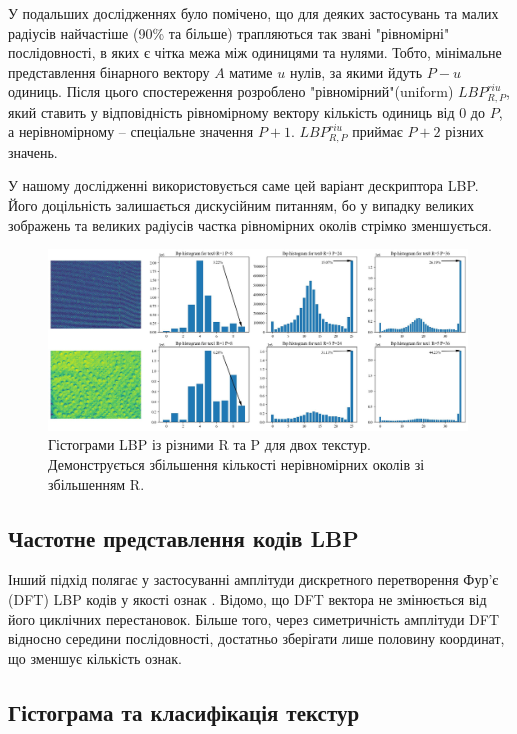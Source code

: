У подальших дослідженнях було помічено, що для деяких застосувань та малих радіусів найчастіше (90\% та більше) трапляються так звані "рівномірні"{} послідовності, 
в яких є чітка межа між одиницями та нулями. Тобто, мінімальне представлення бінарного вектору $A$ матиме $u$ нулів, за якими йдуть $P-u$ одиниць.
Після цього спостереження розроблено "рівномірний"{}(uniform) $LBP^{riu}_{R,P}$, 
який ставить у відповідність рівномірному вектору кількість одиниць від $0$ до $P$, а нерівномірному -- спеціальне значення $P+1$.
$LBP^{riu}_{R,P}$ приймає $P+2$ різних значень.

У нашому дослідженні \cite{fastlbp2024} використовується саме цей варіант дескриптора LBP.
Його доцільність залишається дискусійним питанням, бо у випадку великих зображень та великих радіусів 
частка рівномірних околів стрімко зменшується.

\begin{figure}[h]
    \centering
    \includegraphics[width=0.99\textwidth]{img/cloth-hist-lbpu.jpg}
    \caption{
        Гістограми LBP із різними R та P для двох текстур.
        Демонструється збільшення кількості нерівномірних околів зі збільшенням R.
    }
    \label{fig:cloth-hist-lbpu}
\end{figure}

\subsection{Частотне представлення кодів LBP}\label{section1.1.d}\hfill

Інший підхід полягає у застосуванні амплітуди дискретного перетворення Фур'є (DFT) LBP кодів у якості ознак \cite{arof1998, haley1999}.
Відомо, що DFT вектора не змінюється від його циклічних перестановок. 
Більше того, через симетричність амплітуди DFT відносно середини послідовності, достатньо зберігати лише половину координат, що зменшує кількість ознак. 

\subsection{Гістограма та класифікація текстур}\label{section1.1.f}\hfill

